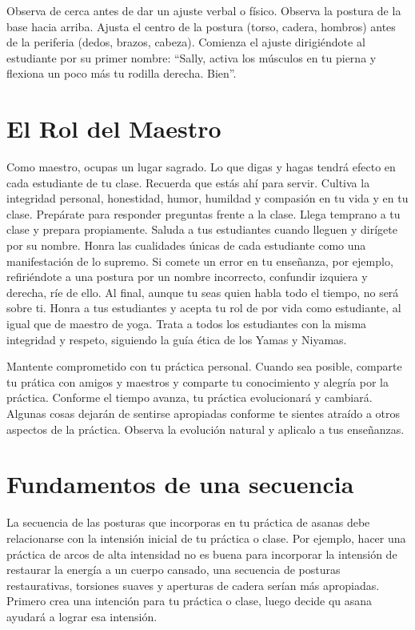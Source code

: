 Observa de cerca antes de dar un ajuste verbal o físico. Observa la postura de la base hacia arriba. Ajusta el centro de la postura (torso, cadera, hombros) antes de la periferia (dedos, brazos, cabeza). Comienza el ajuste dirigi\'endote al estudiante por su primer nombre: ``Sally, activa los músculos en tu pierna y flexiona un poco más tu rodilla derecha. Bien''.

\section{El Rol del Maestro}
Como maestro, ocupas un lugar sagrado. Lo que digas y hagas tendrá efecto en cada estudiante de tu clase. Recuerda que estás ahí para servir. Cultiva la integridad personal, honestidad, humor, humildad y compasión en tu vida y en tu clase. Prepárate para responder preguntas frente a la clase. Llega temprano a tu clase y prepara propiamente. Saluda a tus estudiantes cuando lleguen y dirígete por su nombre. Honra las cualidades únicas de cada estudiante como una manifestación de lo supremo. Si comete un error en tu enseñanza, por ejemplo, refiri\'endote a una postura por un nombre incorrecto, confundir izquiera y derecha, ríe de ello. Al final, aunque tu seas quien habla todo el tiempo, no será sobre ti. Honra a tus estudiantes y acepta tu rol de por vida como estudiante, al igual que de maestro de yoga. Trata a todos los estudiantes con la misma integridad y respeto, siguiendo la guía \'etica de los Yamas y Niyamas.

Mantente comprometido con tu práctica personal. Cuando sea posible, comparte tu prática con amigos y maestros y comparte tu conocimiento y alegría por la práctica. Conforme el tiempo avanza, tu práctica evolucionará y cambiará. Algunas cosas dejarán de sentirse apropiadas conforme te sientes atraído a otros aspectos de la práctica. Observa la evolución natural y aplicalo a tus enseñanzas.

\section{Fundamentos de una secuencia}
\label{sec:fundSec}
La secuencia de las posturas que incorporas en tu práctica de asanas debe relacionarse con la intensión inicial de tu práctica o clase. Por ejemplo, hacer una práctica de arcos de alta intensidad no es buena para incorporar la intensión de restaurar la energía a un cuerpo cansado, una secuencia de posturas restaurativas, torsiones suaves y aperturas de cadera serían más apropiadas. Primero crea una intención para tu práctica o clase, luego decide qu asana ayudará a lograr esa intensión.

